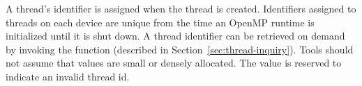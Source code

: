 \begin{comment}
\noindent
The  function \code{ompt\_set\_callback} may only be called within the implementation of a tool's initializer.
The possible return codes for \code{ompt\_set\_callback} and their meaning is shown in Table~\ref{table:ToolsSupport_set_rc}.
Registration of supported callbacks may fail if this function is called outside a tool's initializer.
The \code{ompt\_callback\_t} type for a callback does not reflect the actual signature of the callback; OMPT uses this generic type to avoid the need to declare a separate registration function for each actual callback type.

The OMPT interface function \code{ompt\_get\_callback} may be called at any time to determine whether a callback has been registered or not. 

\begin{boxedcode}
OMPT\_API int \plc{ompt\_get\_callback}(
  ompt\_event\_t \plc{event},
  ompt\_callback\_t *\plc{callback}
);
\end{boxedcode}

\noindent
If a callback has been registered, \code{ompt\_get\_callback} will return 1 and set \code{callback} to the address of the callback function; otherwise \code{ompt\_get\_callback} will return 0.



\section{OMPT Data Types}
\label{sec:data}

\littleheader{Thread Identifier}
\index{Thread Identifier}

Each OpenMP thread  has an associated identifier of type \code{ompt\_thread\_id\_t}. 
\begin{comment}
\begin{boxedcode}
typedef uint64\_t ompt\_thread\_id\_t;
\end{boxedcode}
\end{comment}
  A thread's identifier is assigned when the thread is created. 
  Identifiers assigned to threads on each device are unique from the time an OpenMP runtime is initialized until it is shut down.
  A thread identifier can be retrieved
  on demand by invoking the     
  function (described in Section~\ref{sec:thread-inquiry}).
  Tools should not assume that  values are small or densely allocated. 
  The value  is reserved to indicate an invalid thread id.

